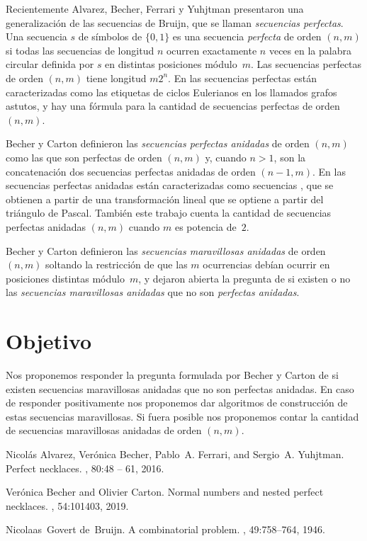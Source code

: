\documentclass[a4paper,11pt]{article}
\begin{document}
Recientemente  Alvarez, Becher, Ferrari y  Yuhjtman \cite{perfectos}
presentaron una generalización de las secuencias de Bruijn,
que se llaman {\em secuencias perfectas}.
  Una secuencia $s $ de símbolos de $\{0,1\}$  es una secuencia
 \emph{perfecta} de orden $(n,m)$  si todas las secuencias 
 de longitud $n$ ocurren exactamente  $n$ veces en
 la palabra circular definida por $s$  en distintas  posiciones módulo~$m$.
Las secuencias perfectas de orden $(n,m)$ tiene longitud  $m2^n$.
En \cite{perfectos} las secuencias perfectas están caracterizadas como las etiquetas de 
ciclos Eulerianos en los llamados grafos astutos, y 
hay una fórmula para la cantidad de secuencias perfectas de orden $(n,m)$.


Becher y Carton \cite{perfectosanidados} definieron 
 las {\em secuencias perfectas anidadas} de orden $(n,m)$
como las que son  perfectas de orden $(n,m)$
y, cuando  $n>1$, son la concatenación  dos secuencias
 perfectas anidadas de orden $(n-1,m)$.
En \cite{perfectosanidados} las secuencias perfectas anidadas están caracterizadas 
como secuencias , que se obtienen a partir de una  transformación
lineal que  se optiene a partir del triángulo de Pascal. También 
 este trabajo cuenta la cantidad de secuencias perfectas anidadas
$(n,m) $  cuando $m$ es potencia de~$2$.

Becher y Carton definieron las  {\em secuencias maravillosas anidadas} 
de orden $(n,m)$ soltando la restricción de que las $m$ 
ocurrencias debían ocurrir  en 
posiciones distintas módulo~$m$, y dejaron abierta la pregunta de si existen o no las 
{\em secuencias maravillosas anidadas} que no son {\em perfectas anidadas}.


\section*{Objetivo}
Nos proponemos responder la pregunta formulada por Becher y Carton 
 de si existen secuencias maravillosas anidadas que no son perfectas anidadas.
En caso de responder positivamente nos proponemos dar algoritmos de construcción de estas secuencias
maravillosas.  Si fuera posible nos proponemos contar la 
cantidad de secuencias maravillosas anidadas de orden $(n,m)$.






\begin{thebibliography}{9}

Nicolás Alvarez, Verónica Becher, Pablo~A. Ferrari, and Sergio~A. Yuhjtman.
\newblock Perfect necklaces.
, 80:48 -- 61, 2016.

Verónica Becher and Olivier Carton.
\newblock Normal numbers and nested perfect necklaces.
, 54:101403, 2019.

Nicolaas~Govert de~Bruijn.
\newblock A combinatorial problem.
,
  49:758--764, 1946.

\end{thebibliography}
\end{document}
